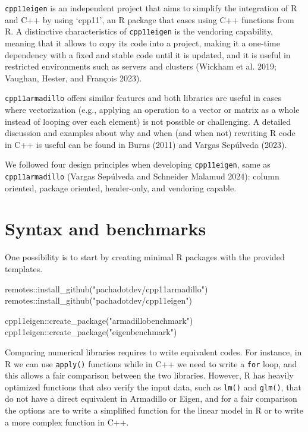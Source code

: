 \documentclass[12pt]{article}
\newenvironment{Shaded}{\begin{snugshade}}{\end{snugshade}}
\newcommand{\FunctionTok}[1]{\textcolor[rgb]{0.28,0.35,0.67}{#1}}
\newcommand{\NormalTok}[1]{\textcolor[rgb]{0.00,0.23,0.31}{#1}}
\newcommand{\SpecialCharTok}[1]{\textcolor[rgb]{0.37,0.37,0.37}{#1}}
\newcommand{\StringTok}[1]{\textcolor[rgb]{0.13,0.47,0.30}{#1}}
\begin{document}
\texttt{cpp11eigen} is an independent project that aims to simplify the
integration of R and C++ by using `cpp11', an R package that eases using
C++ functions from R. A distinctive characteristics of
\texttt{cpp11eigen} is the vendoring capability, meaning that it allows
to copy its code into a project, making it a one-time dependency with a
fixed and stable code until it is updated, and it is useful in
restricted environments such as servers and clusters (Wickham et al.
2019; Vaughan, Hester, and François 2023).

\texttt{cpp11armadillo} offers similar features and both libraries are
useful in cases where vectorization (e.g., applying an operation to a
vector or matrix as a whole instead of looping over each element) is not
possible or challenging. A detailed discussion and examples about why
and when (and when not) rewriting R code in C++ is useful can be found
in Burns (2011) and Vargas Sepúlveda (2023).

We followed four design principles when developing \texttt{cpp11eigen},
same as \texttt{cpp11armadillo} (Vargas Sepúlveda and Schneider Malamud
2024): column oriented, package oriented, header-only, and vendoring
capable.

\section{Syntax and benchmarks}\label{syntax-and-benchmarks}

One possibility is to start by creating minimal R packages with the
provided templates.

\begin{Shaded}
\begin{Highlighting}[]
\NormalTok{remotes}\SpecialCharTok{::}\FunctionTok{install\_github}\NormalTok{(}\StringTok{"pachadotdev/cpp11armadillo"}\NormalTok{)}
\NormalTok{remotes}\SpecialCharTok{::}\FunctionTok{install\_github}\NormalTok{(}\StringTok{"pachadotdev/cpp11eigen"}\NormalTok{)}

\NormalTok{cpp11eigen}\SpecialCharTok{::}\FunctionTok{create\_package}\NormalTok{(}\StringTok{"armadillobenchmark"}\NormalTok{)}
\NormalTok{cpp11eigen}\SpecialCharTok{::}\FunctionTok{create\_package}\NormalTok{(}\StringTok{"eigenbenchmark"}\NormalTok{)}
\end{Highlighting}
\end{Shaded}

Comparing numerical libraries requires to write equivalent codes. For
instance, in R we can use \texttt{apply()} functions while in C++ we
need to write a \texttt{for} loop, and this allows a fair comparison
between the two libraries. However, R has heavily optimized functions
that also verify the input data, such as \texttt{lm()} and
\texttt{glm()}, that do not have a direct equivalent in Armadillo or
Eigen, and for a fair comparison the options are to write a simplified
function for the linear model in R or to write a more complex function
in C++.
\end{document}
